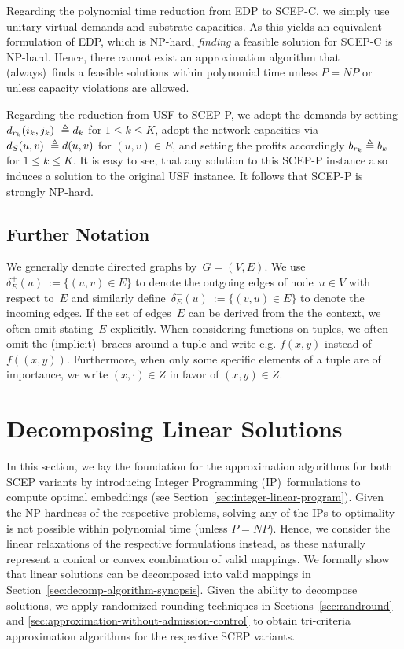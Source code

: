 \documentclass[10pt, conference, letterpaper]{IEEEtran}
\begin{document}
Regarding the polynomial time reduction from EDP to SCEP-C, we simply use unitary virtual demands and substrate capacities. As this yields an equivalent formulation of EDP, which is NP-hard, \emph{finding} a feasible solution for SCEP-C is NP-hard. Hence, there cannot exist an approximation algorithm that (always)~finds a feasible solutions within polynomial time unless $P = \mathit{NP}$ or unless capacity violations are allowed. 

Regarding the reduction from USF to SCEP-P, we adopt the demands by setting $\Vcap[{\req_k}](i_k,j_k)~\triangleq d_k$ for $1 \leq k \leq K$, adopt the network capacities via $\Scap(u,v)~\triangleq d(u,v)$ for $(u,v) \in  E$, and setting the profits accordingly $b_{\req_k} \triangleq b_k$ for $1 \leq k \leq K$. It is easy to see, that any solution to this SCEP-P instance also induces a solution to the original USF instance. It follows that SCEP-P is strongly NP-hard. 


\subsection{Further Notation}

We generally denote directed graphs by~$G=(V,E)$. We use~$\delta^+_E(u)~:= \{(u,v) \in  E \}$ to denote the outgoing edges of node~$u \in V$ with respect to~$E$ and similarly define~$\delta^-_E(u)~:= \{(v,u) \in  E \}$ to denote the incoming edges. If the set of 
edges~$E$ can be derived from the the context, we often omit stating~$E$ explicitly.
When considering functions on tuples, we often omit the (implicit)~braces around a tuple and write e.g. $f(x,y)$ instead of $f((x,y))$.
Furthermore, when only some specific elements of a tuple are of importance, we write $(x,\cdot) \in  Z$ in favor of $(x,y) \in  Z$.

\section{Decomposing Linear Solutions}\label{sec:decompo}

In this section, we lay the foundation for the approximation algorithms for both SCEP variants by introducing Integer Programming (IP)~formulations to compute optimal embeddings (see Section~\ref{sec:integer-linear-program}). Given the NP-hardness of the respective problems, solving any of the IPs to optimality is not possible within polynomial time (unless $P = \mathit{NP}$). Hence, we consider the linear relaxations of the respective formulations instead, as these naturally represent a conical or convex combination of valid mappings.  We formally show that linear solutions can be decomposed into valid mappings in Section~\ref{sec:decomp-algorithm-synopsis}. Given the ability to decompose solutions, we apply randomized rounding techniques in Sections~\ref{sec:randround} and \ref{sec:approximation-without-admission-control} to obtain tri-criteria approximation algorithms for the respective SCEP variants.
\end{document}
